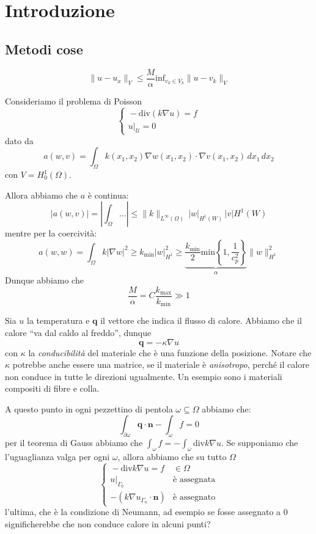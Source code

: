 \chapter{Introduzione}
\section{Metodi cose}

\[
  \|u - u_x\|_V \le \frac{M}{\alpha} \mathrm{inf}_{v_k \in V_k} \| u - v_k\|_V
\]

\begin{example}{}
    Consideriamo il problema di Poisson 
    \[
      \begin{cases}{}
          - \mathrm{div}{(k \nabla u)} = f\\
          u|_{\mathcal{U}} = 0
      \end{cases}
    \]
    dato da 
    \[
      a {(w, v )} = \int _{\Omega} k{(x_{1}, x_{2})} \nabla w {(x_{1}, x_{2})}
      \cdot \nabla v {(x_{1}, x_{2})} \,dx_{1}\, dx_{2}
    \]
    con \(V = H^{1}_0{(\Omega)}\).

    Allora abbiamo che \(a\) è continua:
    \[
      | a{(w, v)} | = \left| \int_\Omega \dots \right| \le
      \|k\|_{L^{\infty}{(\Omega)}}  \, |w|_{H^{1}{(W)}} \, | v | H^{1}{(W)}
    \]
    mentre per la coercività:
    \[
      a{(w, w)} = \int _\Omega k | \nabla w | ^2 \ge k_\text{min} |w|^2_{H^{1}}
      \ge \underbrace{\frac{k_\text{min} }{2} \mathrm{min}\left\{1,
      \frac{1}{c^2_p}\right\}}_{\alpha} 
      \|w\|^2_{H^{1}} 
    \]
    Dunque abbiamo che
    \[
      \frac{M}{\alpha} = C \frac{k_\text{max} }{k_\text{min} } \gg 1
    \]
\end{example}

\begin{example}{}
Sia \(u\) la temperatura e \(\mathbf{q} \) il vettore che indica il flusso di
calore. Abbiamo che il calore ``va dal caldo al freddo'', dunque
\[
  \mathbf{q}  = - \kappa \nabla u
\]
con \(\kappa\) la \emph{conducibilità} del materiale che è una funzione della
posizione. Notare che \(\kappa\) potrebbe anche essere una matrice, se il
materiale è \emph{anisotropo}, perché il calore non conduce in tutte le
direzioni ugualmente. Un esempio sono i materiali compositi di fibre e colla.

A questo punto in ogni pezzettino di pentola \(\omega \subseteq \Omega \)
abbiamo che:
\[
  \int_{\partial \omega} \mathbf{q} \cdot \mathbf{n}  - \int_{\omega} f = 0
\]
per il teorema di Gauss abbiamo che \(\int_\omega f = - \int _{\omega}
\mathrm{div} k \nabla u\). Se supponiamo che l'uguaglianza valga per ogni
\(\omega\), allora abbiamo che su tutto \(\Omega\) 
\[
  \begin{cases}{}
      - \mathrm{div} k \nabla u = f & \in \Omega \\    
      u|_{\Gamma_{0}} & \text{è assegnata} \\
      - (k \nabla u_{\Gamma_n} \cdot \mathbf{n} )& \text{è assegnato}
  \end{cases}
\]
l'ultima, che è la condizione di Neumann, ad esempio se fosse assegnato a 0
significherebbe che non conduce calore in alcuni punti?
\end{example}

